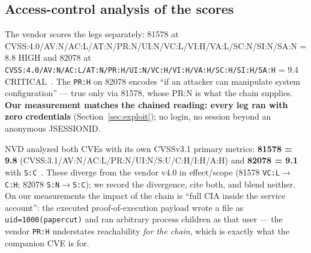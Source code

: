 \documentclass[journal]{IEEEtran}
\begin{document}
\subsection{Access-control analysis of the scores}
The vendor scores the legs separately: 81578 at CVSS:4.0/AV:N/\hspace{0pt}AC:L/\hspace{0pt}AT:N/\hspace{0pt}PR:N/\hspace{0pt}UI:N/\hspace{0pt}VC:L/\hspace{0pt}VI:H/\hspace{0pt}VA:L/\hspace{0pt}SC:N/\hspace{0pt}SI:N/\hspace{0pt}SA:N = 8.8 HIGH and 82078 at \texttt{CVSS:4.0/\hspace{0pt}AV:N/\hspace{0pt}AC:L/\hspace{0pt}AT:N/\hspace{0pt}PR:H/\hspace{0pt}UI:N/\hspace{0pt}VC:H/\hspace{0pt}VI:H/\hspace{0pt}VA:H/\hspace{0pt}SC:H/\hspace{0pt}SI:H/\hspace{0pt}SA:H} = 9.4 CRITICAL~\cite{cve81578,cve82078,advisory}. The \texttt{PR:H} on 82078 encodes ``if an attacker can manipulate system configuration'' — true only via 81578, whose PR:N is what the chain supplies. \textbf{Our measurement matches the chained reading: every leg ran with zero credentials} (Section~\ref{sec:exploit}); no login, no session beyond an anonymous JSESSIONID.

NVD analyzed both CVEs with its own CVSSv3.1 primary metrics: \textbf{81578 =
9.8} (CVSS:3.1/AV:N/\hspace{0pt}AC:L/\hspace{0pt}PR:N/\hspace{0pt}UI:N/\hspace{0pt}S:U/\hspace{0pt}C:H/\hspace{0pt}I:H/\hspace{0pt}A:H) and \textbf{82078 = 9.1} with \texttt{S:C}~\cite{nvd}. These diverge from the vendor v4.0 in effect/scope (81578 \texttt{VC:L}$\to$\texttt{C:H}; 82078 \texttt{S:N}$\to$\texttt{S:C}); we record the divergence, cite both, and blend neither. On our measurements the impact of the chain is ``full CIA inside the service account'': the executed proof-of-execution payload wrote a file as \texttt{uid=1000(papercut)} and ran arbitrary process children as that user — the vendor \texttt{PR:H} understates reachability \emph{for the chain}, which is exactly what the companion CVE is for.
\end{document}

